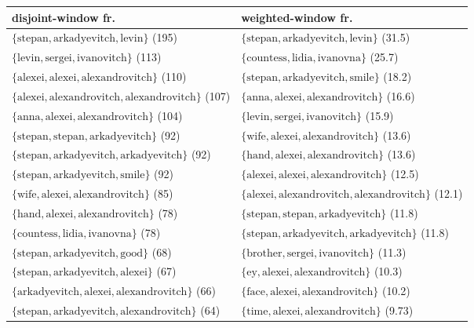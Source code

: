 \begin{table}


\begin{tabulary}{\textwidth}{L|L}

disjoint-window fr. & weighted-window fr. \\
\hline
$ \{ \text{stepan}, \text{arkadyevitch}, \text{levin} \} $ (195) & $ \{ \text{stepan}, \text{arkadyevitch}, \text{levin} \} $ (31.5) \\
$ \{ \text{levin}, \text{sergei}, \text{ivanovitch} \} $ (113) & $ \{ \text{countess}, \text{lidia}, \text{ivanovna} \} $ (25.7) \\
$ \{ \text{alexei}, \text{alexei}, \text{alexandrovitch} \} $ (110) & $ \{ \text{stepan}, \text{arkadyevitch}, \text{smile} \} $ (18.2) \\
$ \{ \text{alexei}, \text{alexandrovitch}, \text{alexandrovitch} \} $ (107) & $ \{ \text{anna}, \text{alexei}, \text{alexandrovitch} \} $ (16.6) \\
$ \{ \text{anna}, \text{alexei}, \text{alexandrovitch} \} $ (104) & $ \{ \text{levin}, \text{sergei}, \text{ivanovitch} \} $ (15.9) \\
$ \{ \text{stepan}, \text{stepan}, \text{arkadyevitch} \} $ (92) & $ \{ \text{wife}, \text{alexei}, \text{alexandrovitch} \} $ (13.6) \\
$ \{ \text{stepan}, \text{arkadyevitch}, \text{arkadyevitch} \} $ (92) & $ \{ \text{hand}, \text{alexei}, \text{alexandrovitch} \} $ (13.6) \\
$ \{ \text{stepan}, \text{arkadyevitch}, \text{smile} \} $ (92) & $ \{ \text{alexei}, \text{alexei}, \text{alexandrovitch} \} $ (12.5) \\
$ \{ \text{wife}, \text{alexei}, \text{alexandrovitch} \} $ (85) & $ \{ \text{alexei}, \text{alexandrovitch}, \text{alexandrovitch} \} $ (12.1) \\
$ \{ \text{hand}, \text{alexei}, \text{alexandrovitch} \} $ (78) & $ \{ \text{stepan}, \text{stepan}, \text{arkadyevitch} \} $ (11.8) \\
$ \{ \text{countess}, \text{lidia}, \text{ivanovna} \} $ (78) & $ \{ \text{stepan}, \text{arkadyevitch}, \text{arkadyevitch} \} $ (11.8) \\
$ \{ \text{stepan}, \text{arkadyevitch}, \text{good} \} $ (68) & $ \{ \text{brother}, \text{sergei}, \text{ivanovitch} \} $ (11.3) \\
$ \{ \text{stepan}, \text{arkadyevitch}, \text{alexei} \} $ (67) & $ \{ \text{ey}, \text{alexei}, \text{alexandrovitch} \} $ (10.3) \\
$ \{ \text{arkadyevitch}, \text{alexei}, \text{alexandrovitch} \} $ (66) & $ \{ \text{face}, \text{alexei}, \text{alexandrovitch} \} $ (10.2) \\
$ \{ \text{stepan}, \text{arkadyevitch}, \text{alexandrovitch} \} $ (64) & $ \{ \text{time}, \text{alexei}, \text{alexandrovitch} \} $ (9.73) \\


\end{tabulary}
\end{table}
